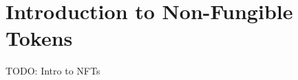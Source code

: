 \documentclass[../main.tex]{subfiles}
\begin{document}
\section{Introduction to Non-Fungible Tokens}
\label{sec:introduction_nfts}
TODO: Intro to NFTs
\end{document}
